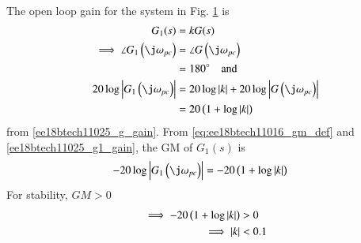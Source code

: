 \begin{enumerate}[label=\thesubsection.\arabic*.,ref=\thesubsection.\theenumi]
\begin{figure}[!ht]
\begin{center}
		\resizebox{\columnwidth}{!}{}
	\end{center}
\caption{}
    \label{fig:ee18btech11025_bock}
\end{figure}
\\
\solution The open loop gain for the system in    Fig.  \ref{fig:ee18btech11025_bock} is
%
    \begin{align}  
            G_1(s) &= kG(s)
\\
\implies \angle G_1\brak{\j\omega_{pc}}  &= \angle G\brak{\j\omega_{pc}}  
\\
&= 180 \degree \quad \text{and}
\\
 20\log\abs{ G_1\brak{\j\omega_{pc}}}  &= 20\log \abs{k }+20\log\abs{ G\brak{\j\omega_{pc}}}
\\
&= 20 \brak{1 + \log \abs{k }}
\label{ee18btech11025_g1_gain}
    \end{align}
from \eqref{ee18btech11025_g_gain}.  From \eqref{eq:ee18btech11016_gm_def} and \eqref{ee18btech11025_g1_gain}, the GM of $G_1(s)$ is
    \begin{align}  
-20\log \abs{ G_1\brak{\j\omega_{pc}}} &= -20 \brak{1 + \log \abs{k }}
    \end{align}
%
For stability, $GM > 0$
    \begin{align}  
\implies  -20 \left(1 + \log \left\vert k \right\vert\right) &> 0
\\
\implies  \left\vert k\right\vert &< 0.1
    \end{align}
%
\end{enumerate}

